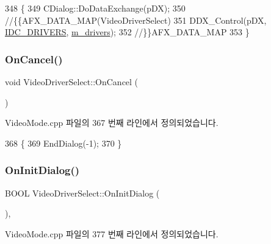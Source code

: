 \begin{DoxyCode}
348 \{
349   CDialog::DoDataExchange(pDX);
350   \textcolor{comment}{//\{\{AFX\_DATA\_MAP(VideoDriverSelect)}
351   DDX\_Control(pDX, \mbox{\hyperlink{resource_8h_a6981ec9ac28e895eee4933ad4932f858}{IDC\_DRIVERS}}, \mbox{\hyperlink{class_video_driver_select_a6f3953363969c0e8a4c52f6247fb41d9}{m\_drivers}});
352   \textcolor{comment}{//\}\}AFX\_DATA\_MAP}
353 \}
\end{DoxyCode}
\mbox{\label{class_video_driver_select_a99f4c0111aa492baa088621c1e615168}} 
\subsubsection{\texorpdfstring{On\+Cancel()}{OnCancel()}}
{\footnotesize\ttfamily void Video\+Driver\+Select\+::\+On\+Cancel (\begin{DoxyParamCaption}{ }\end{DoxyParamCaption})\hspace{0.3cm}{\ttfamily [protected]}}



Video\+Mode.\+cpp 파일의 367 번째 라인에서 정의되었습니다.


\begin{DoxyCode}
368 \{
369   EndDialog(-1);
370 \}
\end{DoxyCode}
\mbox{\label{class_video_driver_select_a3f6aa71282c6849f1f4841867768eaaf}} 
\subsubsection{\texorpdfstring{On\+Init\+Dialog()}{OnInitDialog()}}
{\footnotesize\ttfamily B\+O\+OL Video\+Driver\+Select\+::\+On\+Init\+Dialog (\begin{DoxyParamCaption}{ }\end{DoxyParamCaption})\hspace{0.3cm}{\ttfamily [protected]}, {\ttfamily [virtual]}}



Video\+Mode.\+cpp 파일의 377 번째 라인에서 정의되었습니다.


